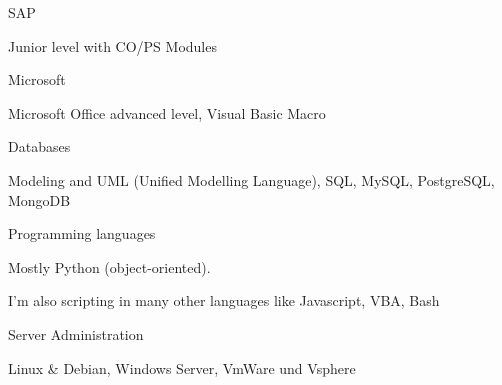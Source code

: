 

\begin{cventries}
	
	\zcventry
	{SAP} %
	{
		\begin{cvitems} %
			\item {Junior level with CO/PS Modules}
		\end{cvitems}
	}
	
	\zcventry
	{Microsoft} %
	{
		\begin{cvitems} %
			\item {Microsoft Office advanced level, Visual Basic Macro}
		\end{cvitems}
	}
	
	\zcventry
	{Databases} %
	{
		\begin{cvitems} %
			\item {Modeling and UML (Unified Modelling Language), SQL, MySQL, PostgreSQL, MongoDB}
		\end{cvitems}
	}
	
	\zcventry
	{Programming languages} %
	{
		\begin{cvitems} %
			\item {Mostly Python (object-oriented).}
			\item {I'm also scripting in many other languages like Javascript, VBA, Bash}
		\end{cvitems}
	}
	
	\zcventry
	{Server Administration} %
	{
		\begin{cvitems} %
			\item {Linux \& Debian, Windows Server, VmWare und Vsphere}
		\end{cvitems}
	}
	

\end{cventries}
